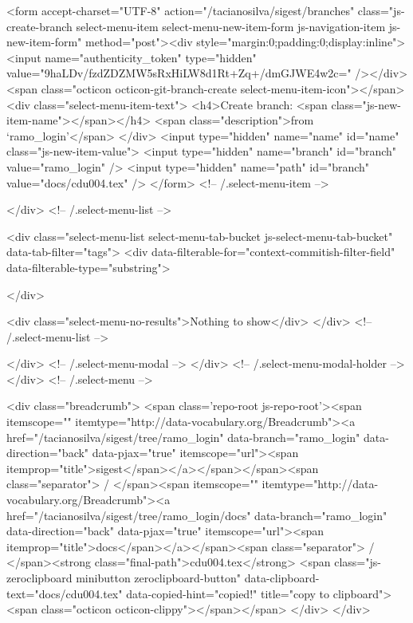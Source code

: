           <form accept-charset="UTF-8" action="/tacianosilva/sigest/branches" class="js-create-branch select-menu-item select-menu-new-item-form js-navigation-item js-new-item-form" method="post"><div style="margin:0;padding:0;display:inline"><input name="authenticity_token" type="hidden" value="9haLDv/fzdZDZMW5sRxHiLW8d1Rt+Zq+/dmGJWE4w2c=" /></div>
            <span class="octicon octicon-git-branch-create select-menu-item-icon"></span>
            <div class="select-menu-item-text">
              <h4>Create branch: <span class="js-new-item-name"></span></h4>
              <span class="description">from ‘ramo_login’</span>
            </div>
            <input type="hidden" name="name" id="name" class="js-new-item-value">
            <input type="hidden" name="branch" id="branch" value="ramo_login" />
            <input type="hidden" name="path" id="branch" value="docs/cdu004.tex" />
          </form> <!-- /.select-menu-item -->

      </div> <!-- /.select-menu-list -->

      <div class="select-menu-list select-menu-tab-bucket js-select-menu-tab-bucket" data-tab-filter="tags">
        <div data-filterable-for="context-commitish-filter-field" data-filterable-type="substring">


        </div>

        <div class="select-menu-no-results">Nothing to show</div>
      </div> <!-- /.select-menu-list -->

    </div> <!-- /.select-menu-modal -->
  </div> <!-- /.select-menu-modal-holder -->
</div> <!-- /.select-menu -->

  <div class="breadcrumb">
    <span class='repo-root js-repo-root'><span itemscope="" itemtype="http://data-vocabulary.org/Breadcrumb"><a href="/tacianosilva/sigest/tree/ramo_login" data-branch="ramo_login" data-direction="back" data-pjax="true" itemscope="url"><span itemprop="title">sigest</span></a></span></span><span class="separator"> / </span><span itemscope="" itemtype="http://data-vocabulary.org/Breadcrumb"><a href="/tacianosilva/sigest/tree/ramo_login/docs" data-branch="ramo_login" data-direction="back" data-pjax="true" itemscope="url"><span itemprop="title">docs</span></a></span><span class="separator"> / </span><strong class="final-path">cdu004.tex</strong> <span class="js-zeroclipboard minibutton zeroclipboard-button" data-clipboard-text="docs/cdu004.tex" data-copied-hint="copied!" title="copy to clipboard"><span class="octicon octicon-clippy"></span></span>
  </div>
</div>


